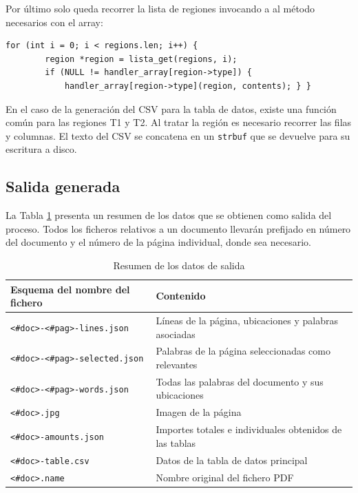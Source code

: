 Por último solo queda recorrer la lista de regiones invocando a al método necesarios con el array: 

\begin{lstlisting}[caption={},label={}]
    for (int i = 0; i < regions.len; i++) {
        region *region = lista_get(regions, i);
        if (NULL != handler_array[region->type]) {
            handler_array[region->type](region, contents); } }
\end{lstlisting}

En el caso de la generación del CSV para la tabla de datos, existe una función común para las regiones T1 y T2. Al tratar la región es necesario recorrer las filas y columnas. El texto del CSV se concatena en un \verb|strbuf| que se devuelve para su escritura a disco.





\subsection{Salida generada}

La Tabla \ref{tab:datos-de-salida} presenta un resumen de los datos que se obtienen como salida del proceso. Todos los ficheros relativos a un documento llevarán prefijado en número del documento y el número de la página individual, donde sea necesario.

\begin{table}[ht]
    \centering
    \begin{tabular}{l l}
        Esquema del nombre del fichero & Contenido \\
        \hline
        \hline
        \verb|<#doc>-<#pag>-lines.json| & Líneas de la página, ubicaciones y palabras asociadas \\
        \verb|<#doc>-<#pag>-selected.json| & Palabras de la página seleccionadas como relevantes \\
        \verb|<#doc>-<#pag>-words.json| & Todas las palabras del documento y sus ubicaciones \\
        \verb|<#doc>.jpg| & Imagen de la página \\
        \verb|<#doc>-amounts.json| & Importes totales e individuales obtenidos de las tablas \\
        \verb|<#doc>-table.csv| & Datos de la tabla de datos principal \\
        \verb|<#doc>.name| & Nombre original del fichero PDF\\
    \end{tabular}
    \caption{Resumen de los datos de salida}    
    \label{tab:datos-de-salida}
\end{table}

